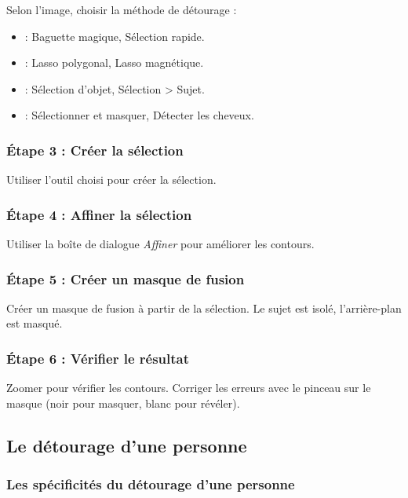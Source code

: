 Selon l'image, choisir la méthode de détourage :

\begin{itemize}
    \item {} : Baguette magique, Sélection rapide.
    \item {} : Lasso polygonal, Lasso magnétique.
    \item {} : Sélection d'objet, Sélection > Sujet.
    \item {} : Sélectionner et masquer, Détecter les cheveux.
\end{itemize}

\subsubsection{Étape 3 : Créer la sélection}

Utiliser l'outil choisi pour créer la sélection.

\subsubsection{Étape 4 : Affiner la sélection}

Utiliser la boîte de dialogue \emph{Affiner} pour améliorer les contours.

\subsubsection{Étape 5 : Créer un masque de fusion}

Créer un masque de fusion à partir de la sélection. Le sujet est isolé, l'arrière-plan est masqué.

\subsubsection{Étape 6 : Vérifier le résultat}

Zoomer pour vérifier les contours. Corriger les erreurs avec le pinceau sur le masque (noir pour masquer, blanc pour révéler).

\subsection{Le détourage d'une personne}

\subsubsection{Les spécificités du détourage d'une personne}


